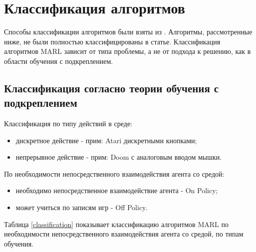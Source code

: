 
\chapter{Классификация алгоритмов}

Способы классификации алгоритмов были взяты из \cite{DBLP:journals/corr/abs-2011-00583}. Алгоритмы, рассмотренные ниже, не были полностью классифицированы в статье.
Классификация алгоритмов MARL зависит от типа проблемы, а не от подхода к решению, как в области обучения с подкреплением. 

\section{Классификация согласно теории обучения с подкреплением}

Классификация по типу действий в среде:
\begin{itemize}[label=---]
	\item дискретное действие - прим: Atari дискретными кнопками; 
	\item непрерывное действие - прим: Doom с аналоговым вводом мышки.
\end{itemize}

По необходимости непосредственного взаимодействия агента со средой:
\begin{itemize}[label=---]
	\item необходимо непосредственное взаимодействие агента - On Policy;
	\item может учиться по записям игр - Off Policy.
\end{itemize}


Таблица \ref{classification} показывает классификацию алгоритмов MARL по необходимости непосредственного взаимодействия агента со средой, по типам обучения.

